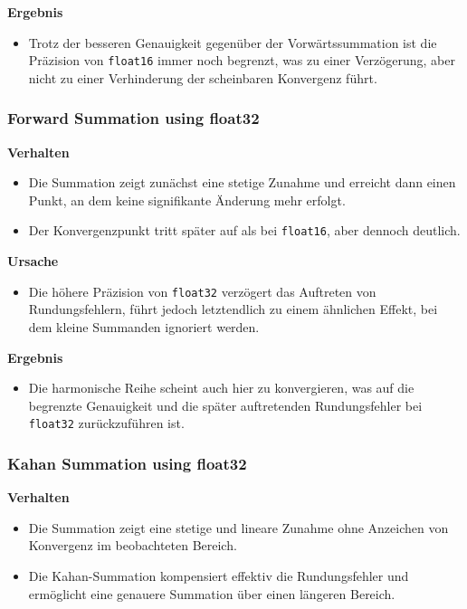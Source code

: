 \documentclass{scrartcl}
\begin{document}
\textbf{Ergebnis}
\begin{itemize}
    \item Trotz der besseren Genauigkeit gegenüber der Vorwärtssummation ist die Präzision von \texttt{float16} immer noch begrenzt, was zu einer Verzögerung, aber nicht zu einer Verhinderung der scheinbaren Konvergenz führt.
\end{itemize}

\subsubsection{Forward Summation using float32}

\textbf{Verhalten}
\begin{itemize}
    \item Die Summation zeigt zunächst eine stetige Zunahme und erreicht dann einen Punkt, an dem keine signifikante Änderung mehr erfolgt.
    \item Der Konvergenzpunkt tritt später auf als bei \texttt{float16}, aber dennoch deutlich.
\end{itemize}

\textbf{Ursache}
\begin{itemize}
    \item Die höhere Präzision von \texttt{float32} verzögert das Auftreten von Rundungsfehlern, führt jedoch letztendlich zu einem ähnlichen Effekt, bei dem kleine Summanden ignoriert werden.
\end{itemize}

\textbf{Ergebnis}
\begin{itemize}
    \item Die harmonische Reihe scheint auch hier zu konvergieren, was auf die begrenzte Genauigkeit und die später auftretenden Rundungsfehler bei \texttt{float32} zurückzuführen ist.
\end{itemize}

\subsubsection{Kahan Summation using float32}

\textbf{Verhalten}
\begin{itemize}
    \item Die Summation zeigt eine stetige und lineare Zunahme ohne Anzeichen von Konvergenz im beobachteten Bereich.
    \item Die Kahan-Summation kompensiert effektiv die Rundungsfehler und ermöglicht eine genauere Summation über einen längeren Bereich.
\end{itemize}
\end{document}

